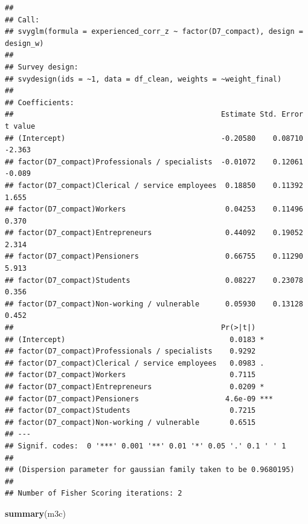 \documentclass[
]{article}
\newenvironment{Shaded}{\begin{snugshade}}{\end{snugshade}}
\newcommand{\FunctionTok}[1]{\textcolor[rgb]{0.13,0.29,0.53}{\textbf{#1}}}
\newcommand{\NormalTok}[1]{#1}
\begin{document}
\begin{verbatim}
## 
## Call:
## svyglm(formula = experienced_corr_z ~ factor(D7_compact), design = design_w)
## 
## Survey design:
## svydesign(ids = ~1, data = df_clean, weights = ~weight_final)
## 
## Coefficients:
##                                                Estimate Std. Error t value
## (Intercept)                                    -0.20580    0.08710  -2.363
## factor(D7_compact)Professionals / specialists  -0.01072    0.12061  -0.089
## factor(D7_compact)Clerical / service employees  0.18850    0.11392   1.655
## factor(D7_compact)Workers                       0.04253    0.11496   0.370
## factor(D7_compact)Entrepreneurs                 0.44092    0.19052   2.314
## factor(D7_compact)Pensioners                    0.66755    0.11290   5.913
## factor(D7_compact)Students                      0.08227    0.23078   0.356
## factor(D7_compact)Non-working / vulnerable      0.05930    0.13128   0.452
##                                                Pr(>|t|)    
## (Intercept)                                      0.0183 *  
## factor(D7_compact)Professionals / specialists    0.9292    
## factor(D7_compact)Clerical / service employees   0.0983 .  
## factor(D7_compact)Workers                        0.7115    
## factor(D7_compact)Entrepreneurs                  0.0209 *  
## factor(D7_compact)Pensioners                    4.6e-09 ***
## factor(D7_compact)Students                       0.7215    
## factor(D7_compact)Non-working / vulnerable       0.6515    
## ---
## Signif. codes:  0 '***' 0.001 '**' 0.01 '*' 0.05 '.' 0.1 ' ' 1
## 
## (Dispersion parameter for gaussian family taken to be 0.9680195)
## 
## Number of Fisher Scoring iterations: 2
\end{verbatim}

\begin{Shaded}
\begin{Highlighting}[]
\FunctionTok{summary}\NormalTok{(m3c)}
\end{Highlighting}
\end{Shaded}
\end{document}

